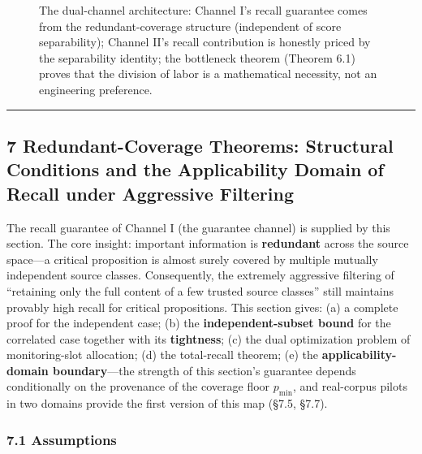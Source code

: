 \documentclass[
  11pt]{article}
\begin{document}
\begin{figure}[h]
{}
\caption{The dual-channel architecture: Channel I's recall guarantee comes from the redundant-coverage structure (independent of score separability); Channel II's recall contribution is honestly priced by the separability identity; the bottleneck theorem (Theorem 6.1) proves that the division of labor is a mathematical necessity, not an engineering preference.}
\end{figure}

\begin{center}\rule{0.5\linewidth}{0.5pt}\end{center}

\subsection{7 Redundant-Coverage Theorems: Structural Conditions and the
Applicability Domain of Recall under Aggressive
Filtering}\label{redundant-coverage-theorems-structural-conditions-and-the-applicability-domain-of-recall-under-aggressive-filtering}

The recall guarantee of Channel I (the guarantee channel) is supplied by
this section. The core insight: important information is
\textbf{redundant} across the source space---a critical proposition is
almost surely covered by multiple mutually independent source classes.
Consequently, the extremely aggressive filtering of ``retaining only the
full content of a few trusted source classes'' still maintains provably
high recall for critical propositions. This section gives: (a) a
complete proof for the independent case; (b) the
\textbf{independent-subset bound} for the correlated case together with
its \textbf{tightness}; (c) the dual optimization problem of
monitoring-slot allocation; (d) the total-recall theorem; (e) the
\textbf{applicability-domain boundary}---the strength of this section's
guarantee depends conditionally on the provenance of the coverage floor
\(p_{\min}\), and real-corpus pilots in two domains provide the first
version of this map (§7.5, §7.7).

\subsubsection{7.1 Assumptions}\label{assumptions}
\end{document}
